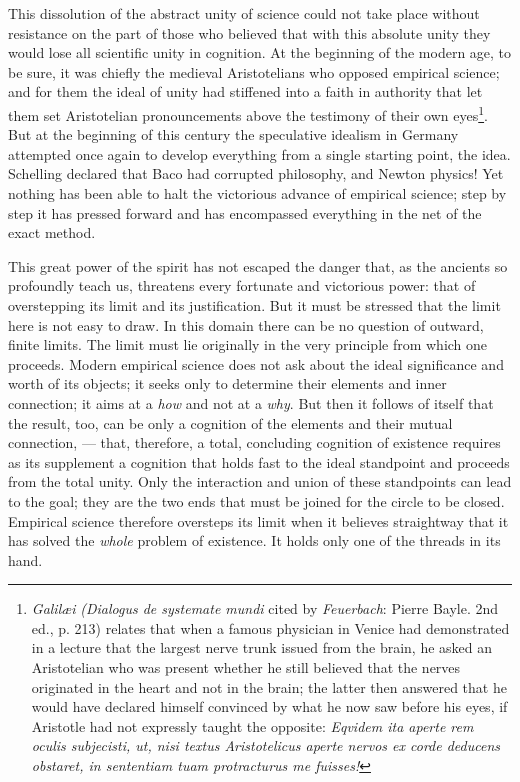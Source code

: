 \documentclass[12pt,a4paper,openany]{book}
\newcommand{\opage}[1]{\marginnote{\footnotesize\textit{[#1]}}}
\begin{document}
This dissolution of the abstract unity of science
could not take place without resistance on the part of those
who believed that with this absolute unity they would lose all scientific
unity in cognition. At the beginning of the modern
age, to be sure, it was chiefly the medieval Aristotelians who opposed
empirical science; and for them the ideal of unity had
stiffened into a faith in authority that let them set
Aristotelian pronouncements above the testimony of their own eyes\footnote{\emph{\textit{Galilæi}} \textit{(Dialogus de systemate mundi} cited by \emph{Feuerbach}: Pierre Bayle. 2nd ed., p. 213) relates that when a famous physician in Venice had demonstrated in a lecture that the largest nerve trunk issued from the brain, he asked an Aristotelian who was present whether he still believed that the nerves originated in the heart and not in the brain; the latter then answered that he would have declared himself convinced by what he now saw before his eyes, if Aristotle had not expressly taught the opposite: \textit{Eqvidem ita aperte rem oculis subjecisti, ut, nisi textus Aristotelicus aperte nervos ex corde deducens obstaret, in sententiam tuam protracturus me fuisses!}}.
But at the beginning of this century the speculative idealism in Germany attempted
once again to develop everything from a single
starting point, the idea. Schelling declared that Baco had
corrupted philosophy, and Newton physics! Yet nothing has
been able to halt the victorious advance of empirical science;
step by step it has pressed forward and has encompassed everything
in the net of the exact method.

This great power of the spirit has not escaped the danger
that, as the ancients so profoundly teach us, threatens every
fortunate and victorious power: that of overstepping its limit and its
\opage{195}justification. But it must be stressed that the limit here
is not easy to draw. In this domain there can be no question
of outward, finite limits. The limit must lie
originally in the very principle from which one proceeds. Modern
empirical science does not ask about the ideal
significance and worth of its objects; it seeks only to determine their
elements and inner connection; it aims at a
\emph{how} and not at a \emph{why}. But then it follows
of itself that the result, too, can be only a cognition
of the elements and their mutual connection, --- that, therefore,
a total, concluding cognition of existence requires
as its supplement a cognition that holds fast to the
ideal standpoint and proceeds from the total unity. Only
the interaction and union of these standpoints
can lead to the goal; they are the two ends that must be joined
for the circle to be closed. Empirical science therefore oversteps
its limit when it believes straightway that it has
solved the \emph{whole} problem of existence. It holds only one
of the threads in its hand.
\end{document}
